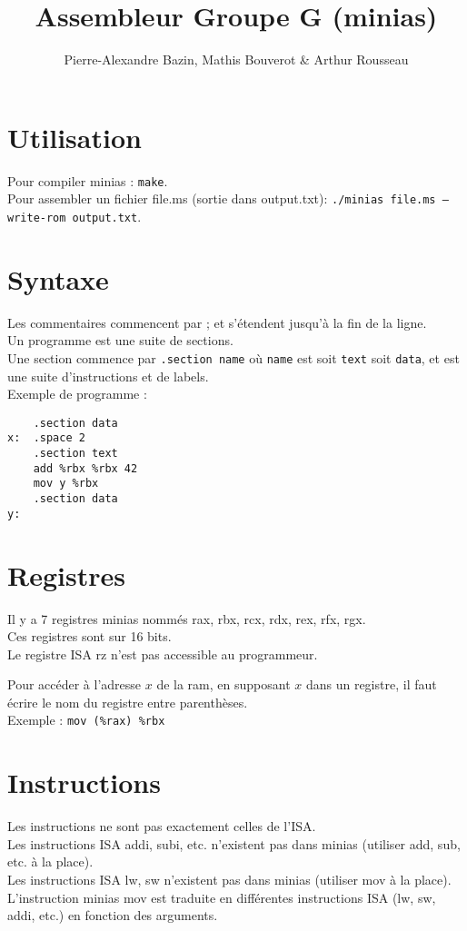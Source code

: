 \documentclass[a4paper]{article}
\title{Assembleur Groupe G (minias)}
\author{Pierre-Alexandre Bazin, Mathis Bouverot \& Arthur Rousseau}
\date{}
\begin{document}
    \maketitle
    \section{Utilisation}
    Pour compiler minias : \texttt{make}.\\
    Pour assembler un fichier file.ms (sortie dans output.txt): \texttt{./minias file.ms --write-rom output.txt}.

    \section{Syntaxe}
    Les commentaires commencent par ; et s'étendent jusqu'à la fin de la ligne.\\
    Un programme est une suite de sections.\\
    Une section commence par \texttt{.section name} où \texttt{name} est soit \texttt{text} soit \texttt{data},
    et est une suite d'instructions et de labels.\\
    Exemple de programme :
\begin{lstlisting}
    .section data
x:  .space 2
    .section text
    add %rbx %rbx 42
    mov y %rbx
    .section data
y:
\end{lstlisting}

    \section{Registres}
    Il y a 7 registres minias nommés rax, rbx, rcx, rdx, rex, rfx, rgx.\\
    Ces registres sont sur 16 bits.\\
    Le registre ISA rz n'est pas accessible au programmeur.

    Pour accéder à l'adresse $x$ de la ram, en supposant $x$ dans un registre, 
    il faut écrire le nom du registre entre parenthèses.\\
    Exemple : \texttt{mov (\%rax) \%rbx}
    
    \section{Instructions}
    Les instructions ne sont pas exactement celles de l'ISA.\\
    Les instructions ISA addi, subi, etc. n'existent pas dans minias (utiliser add, sub, etc. à la place).\\ 
    Les instructions ISA lw, sw n'existent pas dans minias (utiliser mov à la place).\\
    L'instruction minias mov est traduite en différentes instructions ISA (lw, sw, addi, etc.) en fonction des arguments.
\end{document}
